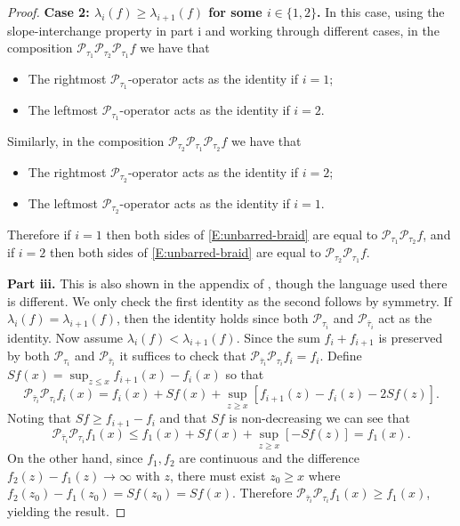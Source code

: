 \documentclass[11pt]{article}
\newcommand{\la}{\lambda}
\newcommand{\cP}{\mathcal{P}}
\theoremstyle{definition} %
\theoremstyle{remark} %
\begin{document}
\begin{proof}
 \medskip
 
 \textbf{Case 2: $\la_i(f) \ge \la_{i+1}(f)$ for some $i \in \{1, 2\}$.} \qquad In this case, using the slope-interchange property in part i and working through different cases, in the composition $\cP_{\tau_1} \cP_{\tau_2} \cP_{\tau_1} f$ we have that
 \begin{itemize}
 	\item The rightmost $\cP_{\tau_1}$-operator acts as the identity if $i = 1$;
 	\item The leftmost $\cP_{\tau_1}$-operator acts as the identity if $i = 2$.
 \end{itemize}
 Similarly, in the composition $\cP_{\tau_2} \cP_{\tau_1} \cP_{\tau_2} f$ we have that
  \begin{itemize}
 	\item The rightmost $\cP_{\tau_2}$-operator acts as the identity if $i=2$;
 	\item The leftmost $\cP_{\tau_2}$-operator acts as the identity if $i=1$.
 \end{itemize}
 Therefore if $i=1$ then both sides of \eqref{E:unbarred-braid} are equal to $\cP_{\tau_1} \cP_{\tau_2} f$, and if $i=2$ then both sides of \eqref{E:unbarred-braid} are equal to $\cP_{\tau_2} \cP_{\tau_1} f$.
 
\textbf{Part iii.} \qquad This is also shown in the appendix of \cite{seppalainen2023busemann}, though the language used there is different. We only check the first identity as the second follows by symmetry. If $\la_i(f) = \la_{i+1}(f)$, then the identity holds since both $\cP_{\tau_i}$ and $\cP_{\bar \tau_i}$ act as the identity. Now assume $\la_i(f) < \la_{i+1}(f)$. Since the sum $f_i + f_{i+1}$ is preserved by both $\cP_{\tau_i}$ and $\cP_{\bar \tau_i}$ it suffices to check that $\cP_{\bar \tau_i} \cP_{\tau_i} f_i = f_i$. Define
 $
 S f(x) = \sup_{z \le x} f_{i+1}(x) - f_i(x)
 $
 so that
 $$
 \cP_{\bar \tau_i} \cP_{\tau_i} f_i(x) = f_i (x) + S f(x) + \sup_{z \ge x} [f_{i+1} (z) - f_i(z) - 2 S f(z)].
 $$
Noting that $S f \ge f_{i+1} - f_i$ and that $Sf$ is non-decreasing we can see that 
$$
\cP_{\bar \tau_i} \cP_{\tau_i} f_1(x) \le f_1 (x) + S f(x) + \sup_{z \ge x} [- S f(z)] = f_1 (x).
$$
On the other hand, since $f_1, f_2$ are continuous and the difference $f_2(z) - f_1(z) \to \infty$ with $z$, there must exist $z_0 \ge x$ where  $f_2(z_0) - f_1(z_0) = S f(z_0) = Sf(x).$ Therefore $\cP_{\bar \tau_i} \cP_{\tau_i} f_1(x) \ge f_1(x)$, yielding the result.
\end{proof}
\end{document}
